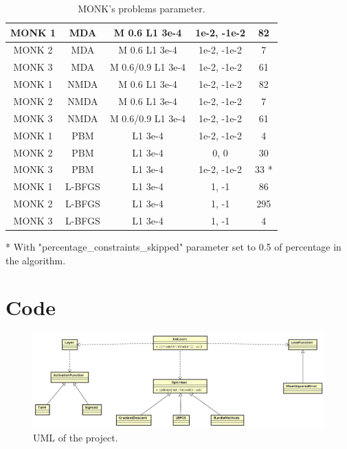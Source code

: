 \begin{table}[H]
\begin{tabular}{|c|c|c|c|c|}
		MONK 1        &    MDA & M  0.6 L1 3e-4 & 1e-2, -1e-2 & 82  \\ \hline
		MONK 2        &    MDA & M  0.6 L1 3e-4 & 1e-2, -1e-2 & 7  \\ \hline
		MONK 3        &    MDA & M  0.6/0.9 L1 3e-4 & 1e-2, -1e-2 & 61  \\ \hline
		MONK 1        &    NMDA & M  0.6 L1 3e-4 & 1e-2, -1e-2 & 82  \\ \hline
		MONK 2        &    NMDA & M  0.6 L1 3e-4 & 1e-2, -1e-2 & 7  \\ \hline
		MONK 3        &    NMDA & M  0.6/0.9 L1 3e-4 & 1e-2, -1e-2 & 61  \\ \hline
		MONK 1        &    PBM & L1 3e-4 & 1e-2, -1e-2 & 4  \\ \hline
		MONK 2        &    PBM & L1 3e-4 & 0, 0 & 30  \\ \hline
		MONK 3        &    PBM & L1 3e-4 & 1e-2, -1e-2 & 33 *  \\ \hline
		MONK 1        &    L-BFGS & L1 3e-4 & 1, -1 & 86  \\ \hline
		MONK 2        &    L-BFGS & L1 3e-4 & 1, -1 & 295  \\ \hline
		MONK 3        &    L-BFGS & L1 3e-4 & 1, -1 & 4  \\ \hline
	\end{tabular}
	\caption{MONK's problems parameter.}
	\label{tab:dati}
\end{table}
* With "percentage\_constraints\_skipped" parameter set to 0.5 of percentage in the algorithm.

\section{Code}
\begin{figure}[H]
	\centering
	\includegraphics[width=\linewidth]{img/uml.jpg}
	\caption{UML of the project.}
\end{figure}
\newpage